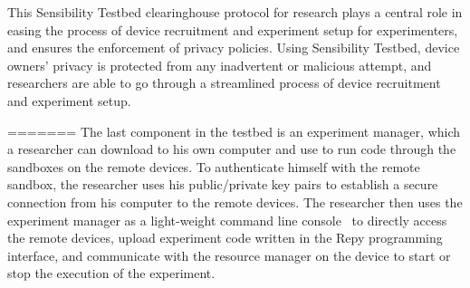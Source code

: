 {{\smallskip
This Sensibility Testbed clearinghouse protocol for research plays a central role in
easing the process of device recruitment and experiment setup for experimenters, 
and ensures the enforcement of privacy policies. 
%
%
Using Sensibility Testbed, device owners' privacy is protected
from any inadvertent or malicious attempt, and researchers 
are able to go through a streamlined process of device 
recruitment and experiment setup.

=======
The last component in the testbed is an experiment manager, which a 
researcher can download to his own computer and use to run code through 
the sandboxes on the remote devices. 
To authenticate himself with the remote sandbox, the researcher uses 
his public/private key pairs to establish a secure connection from his
computer to the remote devices. The researcher then uses the
experiment manager as a light-weight command line 
console~\cite{demo-kit} to directly access the remote devices, upload 
experiment code written in the Repy programming interface, and
communicate with the resource manager on the device to start 
or stop the execution of the experiment. 

}}
